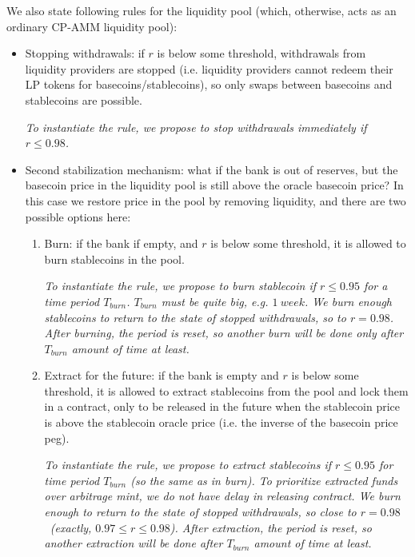 \documentclass[a4paper,UKenglish,cleveref, autoref, thm-restate]{lipics-v2021}
\newcommand{\sct}{stablecoin}
\begin{document}
We also state following rules for the liquidity pool (which, otherwise, acts as an ordinary CP-AMM liquidity pool): 

\begin{itemize}
   \item{Stopping withdrawals:} if $r$ is below some threshold, withdrawals from liquidity providers are stopped (i.e. liquidity providers cannot redeem their LP tokens for basecoins/stablecoins), so only swaps between basecoins and stablecoins are possible.  
   
   \emph{To instantiate the rule, we propose to stop withdrawals immediately if $r \le 0.98$.}

   \item{Second stabilization mechanism:} what if the bank is out of reserves, but the basecoin price in the liquidity pool is still above the oracle basecoin price? In this case we restore price in the pool by removing liquidity, and there are two possible options here:

   \begin{enumerate}
   \item{Burn:} if the bank if empty, and $r$ is below some threshold, it is allowed to burn \sct{}s in the pool. 
   
   \emph{To instantiate the rule, we propose to burn \sct{} if $r \le 0.95$ for a time period $T_{burn}$. $T_{burn}$ must be quite big, e.g. $1 {\ week}$. We burn enough stablecoins to return to the state of stopped withdrawals, so to $r = 0.98$. After burning, the period is reset, so another burn will be done only after $T_{burn}$ amount of time at least.}

   \item{Extract for the future:} if the bank is empty and $r$ is below some threshold, it is allowed to extract \sct{}s from the pool and lock them in a contract, only to be released in the future when the \sct{} price is above the stablecoin oracle price (i.e. the inverse of the basecoin price peg).
   
   \emph{To instantiate the rule, we propose to extract \sct{}s if $r \le 0.95$ for time period $T_{burn}$ (so the same as in burn). 
   To prioritize extracted funds over arbitrage mint, we do not have delay in releasing contract. We burn enough to return to the state of stopped withdrawals, so close to $r = 0.98$~(exactly, $0.97 \le r \le 0.98$). After extraction, the period is reset, so another extraction will be done after $T_{burn}$ amount of time at least.}
   \end{enumerate}
\end{itemize} 
\end{document}
